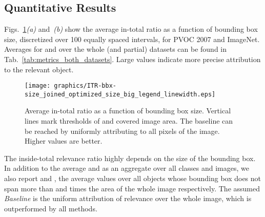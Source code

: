 \documentclass[conference]{IEEEtran}
\begin{document}
\subsection{Quantitative Results}
\label{sec:results-quantitative}
Figs.~\ref{fig:itr_curves_joined}\emph{(a)} and~\emph{(b)} show the average in-total ratio  as a function of bounding box size, discretized over 100 equally spaced intervals, for PVOC 2007 and ImageNet.
Averages for  and  over the whole (and partial) datasets can be found in Tab.~\ref{tab:metrics_both_datasets}.
Large values indicate more precise attribution to the relevant object.

\begin{figure}[t]
  \centering
  \texttt{[image: graphics/ITR-bbx-size\_joined\_optimized\_size\_big\_legend\_linewidth.eps]} \caption{
    Average in-total ratio  as a function of bounding box size.
    Vertical lines mark thresholds of  and  covered image area.
    The baseline can be reached by uniformly attributing to all pixels of the image.
    Higher values are better.}
  \label{fig:itr_curves_joined}
\end{figure}


The inside-total relevance ratio highly depends on the size of the bounding box.
In addition to the average  and  as an aggregate over all classes and images, we also report  and , the average values over all objects whose bounding box does not span more than  and  times the area of the whole image respectively.
The assumed \emph{Baseline}
is the uniform attribution of relevance
over the whole image,
which is outperformed by all methods.
\end{document}
